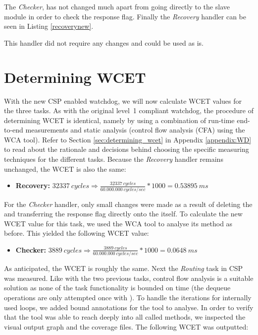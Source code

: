 

The \textit{Checker}, has not changed much apart from going directly to the slave module in order to check the response flag. Finally the \textit{Recovery} handler can be seen in Listing \ref{recoverynew}.



This handler did not require any changes and could be used as is.

\section{Determining WCET}
With the new CSP enabled watchdog, we will now calculate WCET values for the three tasks. As with the original level~1 compliant watchdog, the procedure of determining WCET is identical, namely by using a combination of run-time end-to-end measurements and static analysis (control flow analysis (CFA) using the WCA tool). Refer to Section \ref{sec:determining_wcet} in Appendix \ref{appendix:WD} to read about the rationale and decisions behind choosing the specific measuring techniques for the different tasks. Because the \textit{Recovery} handler remains unchanged, the WCET is also the same:

\begin{itemize}
	\item \textbf{Recovery:} $32337\ cycles \Rightarrow \frac{32337\ cycles}{60.000.000\ cycles/sec} * 1000 = 0.53895\ ms$
\end{itemize}

For the \textit{Checker} handler, only small changes were made as a result of deleting the  and transferring the response flag directly onto the  itself. To calculate the new WCET value for this task, we used the WCA tool to analyse its  method as before. This yielded the following WCET value:

\begin{itemize}
	\item \textbf{Checker:} $3889\ cycles \Rightarrow \frac{3889\ cycles}{60.000.000\ cycles/sec} * 1000 = 0.0648\ ms$
\end{itemize}

As anticipated, the WCET is roughly the same. Next the \textit{Routing} task in CSP was measured. Like with the two previous tasks, control flow analysis is a suitable solution as none of the task functionality is bounded on time (the dequeue operations are only attempted once with ). To handle the iterations for internally used loops, we added bound annotations for the tool to analyse. In order to verify that the tool was able to reach deeply into all called methods, we inspected the visual output graph and the coverage files. The following WCET was outputted:

